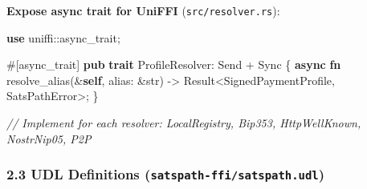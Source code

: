 \documentclass[
]{article}
\newenvironment{Shaded}{}{}
\newcommand{\AttributeTok}[1]{\textcolor[rgb]{0.49,0.56,0.16}{#1}}
\newcommand{\BuiltInTok}[1]{\textcolor[rgb]{0.00,0.50,0.00}{#1}}
\newcommand{\CommentTok}[1]{\textcolor[rgb]{0.38,0.63,0.69}{\textit{#1}}}
\newcommand{\DataTypeTok}[1]{\textcolor[rgb]{0.56,0.13,0.00}{#1}}
\newcommand{\KeywordTok}[1]{\textcolor[rgb]{0.00,0.44,0.13}{\textbf{#1}}}
\newcommand{\NormalTok}[1]{#1}
\newcommand{\OperatorTok}[1]{\textcolor[rgb]{0.40,0.40,0.40}{#1}}
\newcommand{\PreprocessorTok}[1]{\textcolor[rgb]{0.74,0.48,0.00}{#1}}
\begin{document}
\textbf{Expose async trait for UniFFI} (\texttt{src/resolver.rs}):

\begin{Shaded}
\begin{Highlighting}[]
\KeywordTok{use} \PreprocessorTok{uniffi::}\NormalTok{async\_trait}\OperatorTok{;}

\AttributeTok{\#[}\NormalTok{async\_trait}\AttributeTok{]}
\KeywordTok{pub} \KeywordTok{trait}\NormalTok{ ProfileResolver}\OperatorTok{:} \BuiltInTok{Send} \OperatorTok{+} \BuiltInTok{Sync} \OperatorTok{\{}
    \KeywordTok{async} \KeywordTok{fn}\NormalTok{ resolve\_alias(}\OperatorTok{\&}\KeywordTok{self}\OperatorTok{,}\NormalTok{ alias}\OperatorTok{:} \OperatorTok{\&}\DataTypeTok{str}\NormalTok{) }\OperatorTok{{-}\textgreater{}} \DataTypeTok{Result}\OperatorTok{\textless{}}\NormalTok{SignedPaymentProfile}\OperatorTok{,}\NormalTok{ SatsPathError}\OperatorTok{\textgreater{};}
\OperatorTok{\}}

\CommentTok{// Implement for each resolver: LocalRegistry, Bip353, HttpWellKnown, NostrNip05, P2P}
\end{Highlighting}
\end{Shaded}

\hypertarget{udl-definitions-satspath-ffisatspath.udl}{%
\subsubsection{\texorpdfstring{2.3 UDL Definitions
(\texttt{satspath-ffi/satspath.udl})}{2.3 UDL Definitions (satspath-ffi/satspath.udl)}}\label{udl-definitions-satspath-ffisatspath.udl}}
\end{document}
